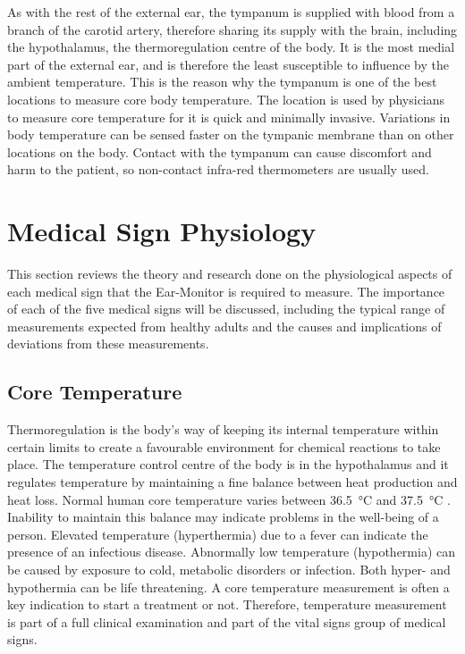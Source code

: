 \medskip
As with the rest of the external ear, the tympanum is supplied with blood from a branch of the carotid artery, therefore sharing its supply with the brain, including the hypothalamus, the thermoregulation centre of the body. It is the most medial part of the external ear, and is therefore the least susceptible to influence by the ambient temperature. This is the reason why the tympanum is one of the best locations to measure core body temperature. The location is used by physicians to measure core temperature for it is quick and minimally invasive. Variations in body temperature can be sensed faster on the tympanic membrane than on other locations on the body. Contact with the tympanum can cause discomfort and harm to the patient, so non-contact infra-red thermometers are usually used.


\section{Medical Sign Physiology} %
This section reviews the theory and research done on the physiological aspects of each medical sign that the Ear-Monitor is required to measure. The importance of each of the five medical signs will be discussed, including the typical range of measurements expected from healthy adults and the causes and implications of deviations from these measurements.

\subsection{Core Temperature}
Thermoregulation is the body's way of keeping its internal temperature within certain limits to create a favourable environment for chemical reactions to take place. The temperature control centre of the body is in the hypothalamus and it regulates temperature by maintaining a fine balance between heat production and heat loss. Normal human core temperature varies between \SI{36.5}{\celsius} and \SI{37.5}{\celsius} \citep{jones2010biomedical}. Inability to maintain this balance may indicate problems in the well-being of a person. Elevated temperature (hyperthermia) due to a fever can indicate the presence of an infectious disease. Abnormally low temperature (hypothermia) can be caused by exposure to cold, metabolic disorders or infection. Both hyper- and hypothermia can be life threatening. A core temperature measurement is often a key indication to start a treatment or not. Therefore, temperature measurement is part of a full clinical examination and part of the vital signs group of medical signs.

